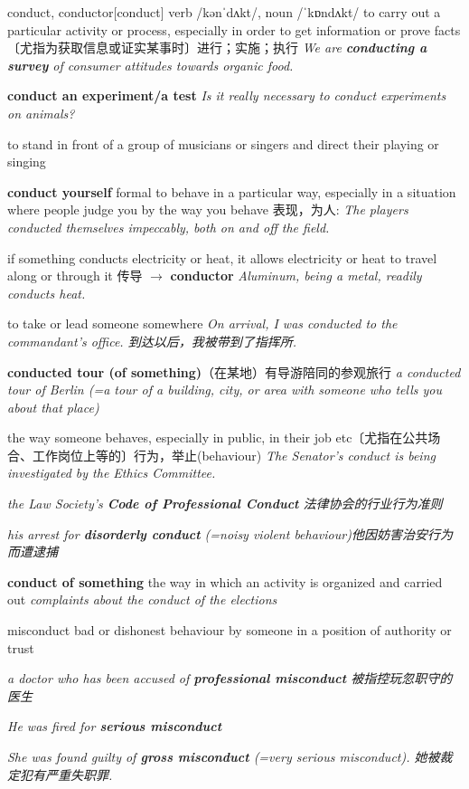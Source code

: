 \begin{DefWord}{conduct, conductor}[conduct]
    verb /kənˈdʌkt/, noun  /ˈkɒndʌkt/ 
    to carry out a particular activity or process, especially in order to get information or prove facts 〔尤指为获取信息或证实某事时〕进行；实施；执行
    \textit{We are \textbf{conducting a survey} of consumer attitudes towards organic food.}

    \textbf{conduct an experiment/a test}
    \textit{Is it really necessary to conduct experiments on animals?}

    to stand in front of a group of musicians or singers and direct their playing or singing

    \textbf{conduct yourself} formal to behave in a particular way, especially in a situation where people judge you by the way you behave 表现，为人:
    \textit{The players conducted themselves impeccably, both on and off the field.}


    if something conducts electricity or heat, it allows electricity or heat to travel along or through it 传导 $\rightarrow$ \textbf{conductor}
    \textit{Aluminum, being a metal, readily conducts heat.}

    to take or lead someone somewhere
    \textit{On arrival, I was conducted to the commandant's office. 到达以后，我被带到了指挥所. }

    \textbf{conducted tour (of something)}（在某地）有导游陪同的参观旅行
    \textit{a conducted tour of Berlin (=a tour of a building, city, or area with someone who tells you about that place)}

    the way someone behaves, especially in public, in their job etc〔尤指在公共场合、工作岗位上等的〕行为，举止(behaviour)
    \textit{The Senator's conduct is being investigated by the Ethics Committee.}

    \textit{the Law Society's \textbf{Code of Professional Conduct} 法律协会的行业行为准则}

    \textit{his arrest for \textbf{disorderly conduct} (=noisy violent behaviour)他因妨害治安行为而遭逮捕}

    \textbf{conduct of something} the way in which an activity is organized and carried out
   \textit{complaints about the conduct of the elections}
\end{DefWord}

\begin{DefWord}{misconduct}
    bad or dishonest behaviour by someone in a position of authority or trust

    \textit{a doctor who has been accused of \textbf{professional misconduct} 被指控玩忽职守的医生}

    \textit{He was fired for \textbf{serious misconduct}}

    \textit{She was found guilty of \textbf{gross misconduct} (=very serious misconduct). 她被裁定犯有严重失职罪. }
\end{DefWord}

